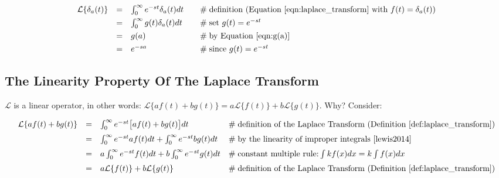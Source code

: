 \documentclass{article}
\theoremstyle{definition}
\begin{document}
\bigskip
\begin{equation*}
\begin{array}{lllll}
\mathcal{L}\{\delta_a(t)\} 
&=& \int_0^\infty  e^{-st} \delta_a(t) dt    &\quad  \mathrel{\#} \text{definition (Equation \ref{eqn:laplace_transform} with $f(t) = \delta_a(t)$)} \\  
[4pt]                                                        %
&=& \int_0^\infty g(t) \delta_a(t) dt         &\quad  \mathrel{\#} \text{set $g(t) = e^{-st}$}                                                                                      \\
[4pt]                                                        %
&=& g(a)                                                &\quad  \mathrel{\#} \text{by Equation \ref{eqn:g(a)}}                                                                           \\
[4pt]                                                        %
&=& e^{-sa}                                            &\quad  \mathrel{\#} \text{since $g(t) = e^{-st}$}
\end{array}
\end{equation*}

\subsection{The Linearity Property Of The Laplace Transform}
\bigskip
\noindent
$\mathcal{L}$ is a linear operator, in other words: $\mathcal{L}\{af (t) + bg(t)\} = a\mathcal{L}\{f(t)\} + b\mathcal{L}\{g(t)\}$. Why? Consider:

\bigskip
\begin{equation*}
\begin{array}{lllll}
\mathcal{L}\{af (t) + bg(t)\} 
&=& \int_0^\infty e^{-st} \big [af (t) + bg(t) \big] dt                                & \mathrel{\#} \text{definition of the Laplace Transform (Definition \ref{def:laplace_transform})}   \\  
[6pt]                                                                                                     %
&=& \int_0^\infty e^{-st} af (t)  dt + \int_0^\infty e^{-st}  bg(t)  dt          & \mathrel{\#} \text{by the linearity of improper integrals \cite{lewis2014}}                                     \\
[6pt]                                                                                                     %
&=& a \int_0^\infty e^{-st}  f(t) dt + b \int_0^\infty e^{-st}  g(t) dt          & \mathrel{\#} \text{constant multiple rule:} \int k f(x) dx = k \int f(x) dx                                          \\
[6pt]                                                                                                     %
&=& a \mathcal{L}\{f(t)\}  + b \mathcal{L}\{g(t)\}                                   & \mathrel{\#} \text{definition of the Laplace Transform  (Definition \ref{def:laplace_transform})}
\end{array}
\end{equation*}
\end{document}
